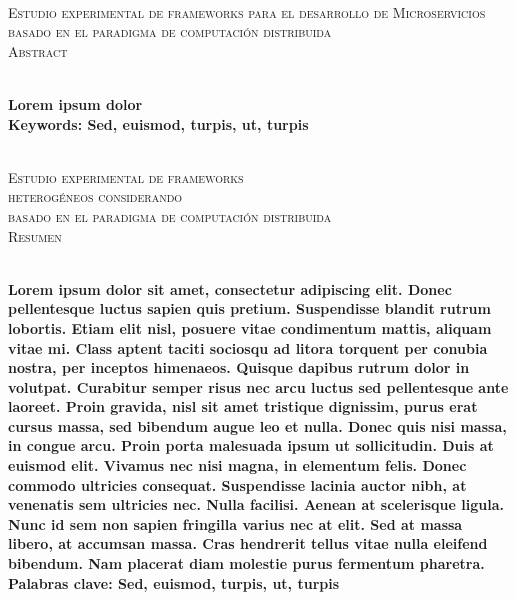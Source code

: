 
{
    \thispagestyle{empty}
    
    \begin{center}
    ~\\[0.2cm]
        \textsc{\huge Estudio experimental de frameworks para el desarrollo de Microservicios } \\[0.2cm] 
        \textsc{\huge basado en el paradigma de computación distribuida} \\[1cm]
        \textsc{\Large Abstract}
    \end{center}
    ~\\[0.2cm]
    \textbf{\large 
    Lorem ipsum dolor
    }
	~\\[1.0cm]
    \textbf{\large Keywords: Sed, euismod, turpis, ut, turpis}
}
\clearpage
{
    \begin{center}
     ~\\[0.2cm]
        \textsc{\huge Estudio experimental de frameworks } \\[0.2cm]
        \textsc{\huge heterog\'eneos considerando} \\[0.2cm]
        \textsc{\huge basado en el paradigma de computación distribuida} \\[1.0cm]
        \textsc{\Large Resumen}
    \end{center}
    ~\\[0.2cm]
    \textbf{\large Lorem ipsum dolor sit amet, consectetur adipiscing elit. Donec pellentesque luctus sapien quis pretium. Suspendisse blandit rutrum lobortis. Etiam elit nisl, posuere vitae condimentum mattis, aliquam vitae mi. Class aptent taciti sociosqu ad litora torquent per conubia nostra, per inceptos himenaeos. Quisque dapibus rutrum dolor in volutpat. Curabitur semper risus nec arcu luctus sed pellentesque ante laoreet. Proin gravida, nisl sit amet tristique dignissim, purus erat cursus massa, sed bibendum augue leo et nulla.
Donec quis nisi massa, in congue arcu. Proin porta malesuada ipsum ut sollicitudin. Duis at euismod elit. Vivamus nec nisi magna, in elementum felis. Donec commodo ultricies consequat. Suspendisse lacinia auctor nibh, at venenatis sem ultricies nec. Nulla facilisi. Aenean at scelerisque ligula. Nunc id sem non sapien fringilla varius nec at elit. Sed at massa libero, at accumsan massa. Cras hendrerit tellus vitae nulla eleifend bibendum. Nam placerat diam molestie purus fermentum pharetra.}
	~\\[1.0cm]
    \textbf{\large Palabras clave: Sed, euismod, turpis, ut, turpis}	
}
\cleardoublepage
